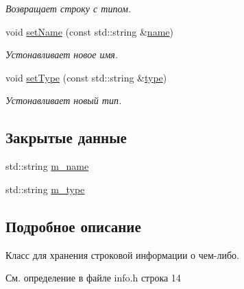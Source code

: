 \begin{DoxyCompactItemize}
\begin{DoxyCompactList}\small\item\em Возвращает строку с типом. \end{DoxyCompactList}\item 
void \hyperlink{class_core_1_1_info_aec94bce55147a4440ea52199706f6477}{set\+Name} (const std\+::string \&\hyperlink{class_core_1_1_info_a57765c8ec20443b58688232fa1382449}{name})\hypertarget{class_core_1_1_info_aec94bce55147a4440ea52199706f6477}{}\label{class_core_1_1_info_aec94bce55147a4440ea52199706f6477}

\begin{DoxyCompactList}\small\item\em Устонавливает новое имя. \end{DoxyCompactList}\item 
void \hyperlink{class_core_1_1_info_af6dffe2ec6648d8d6f383d55bb1f4228}{set\+Type} (const std\+::string \&\hyperlink{class_core_1_1_info_a78d69b6d25831677b638f113f6a04691}{type})\hypertarget{class_core_1_1_info_af6dffe2ec6648d8d6f383d55bb1f4228}{}\label{class_core_1_1_info_af6dffe2ec6648d8d6f383d55bb1f4228}

\begin{DoxyCompactList}\small\item\em Устонавливает новый тип. \end{DoxyCompactList}\end{DoxyCompactItemize}
\subsection*{Закрытые данные}
\begin{DoxyCompactItemize}
\item 
std\+::string \hyperlink{class_core_1_1_info_a027464b5db2e89c6c2f48faf99d25b22}{m\+\_\+name}
\item 
std\+::string \hyperlink{class_core_1_1_info_aa5d089f59122826625d6dd68af47775e}{m\+\_\+type}
\end{DoxyCompactItemize}


\subsection{Подробное описание}
Класс для хранения строковой информации о чем-\/либо. 

См. определение в файле info.\+h строка 14



